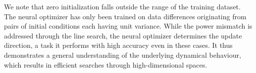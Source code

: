 We note that zero initialization falls outside the range of the training dataset. The neural optimizer has only been trained on data differences originating from pairs of initial conditions each having unit variance. While the power mismatch is addressed through the line search, the neural optimizer determines the update direction, a task it performs with high accuracy even in these cases. It thus demonstrates a general understanding of the underlying dynamical behaviour, which results in efficient searches through high-dimensional spaces. 